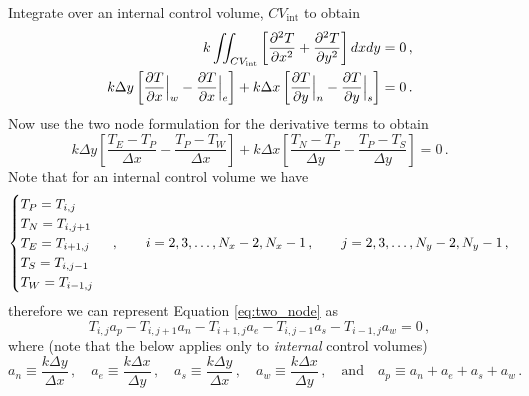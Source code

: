 \documentclass{article}
\begin{document}
Integrate over an internal control volume, $CV_\text{int}$ to obtain
\begin{align*}
	k \iint_{CV_\text{int}} \left[ \pdv{^2T}{x^2} + \pdv{^2T}{y^2} \right] dxdy & = 0\,,\\
	k \Delta y \left[ \pdv{T}{x}\Big|_{w} - \pdv{T}{x}\Big|_{e} \right] + k \Delta x \left[ \pdv{T}{y}\Big|_{n} - \pdv{T}{y}\Big|_{s} \right] & = 0\,.
\end{align*}
Now use the two node formulation for the derivative terms to obtain
\begin{equation}
	\label{eq:two_node}
	k \Delta y \left[\frac{T_{E} - T_{P}}{\Delta x} - \frac{T_{P} - T_{W}}{\Delta x}\right] + k \Delta x \left[ \frac{T_{N} - T_{P}}{\Delta y} -\frac{T_{P} - T_{S}}{\Delta y} \right] = 0\,.
\end{equation}
Note that for an internal control volume we have
\[
	\begin{cases}
		T_P = T_{i,j} \\
		T_N = T_{i,j+1} \\
		T_E = T_{i+1,j} \\
		T_S = T_{i,j-1} \\
		T_W = T_{i-1,j}
	\end{cases}\,, \qquad i = 2, 3, \ldots, N_x - 2, N_x - 1\,, \qquad j = 2, 3, \ldots, N_y - 2, N_y - 1\,,\\
\]
therefore we can represent Equation \eqref{eq:two_node} as
\[
	T_{i,j} a_p - T_{i, j+1} a_n - T_{i+1, j} a_e - T_{i, j-1} a_s - T_{i-1, j} a_w = 0\,,
\]
where (note that the below applies only to \textit{internal} control volumes)
\[
	a_n \equiv \frac{k \Delta y}{\Delta x}\,, \quad a_e \equiv \frac{k \Delta x}{\Delta y}\,, \quad a_s \equiv \frac{k\Delta y}{\Delta x}\,, \quad a_w \equiv \frac{k\Delta x}{\Delta y}\,, \quad \text{and} \quad a_p \equiv a_n + a_e + a_s + a_w\,.
\]
\end{document}
